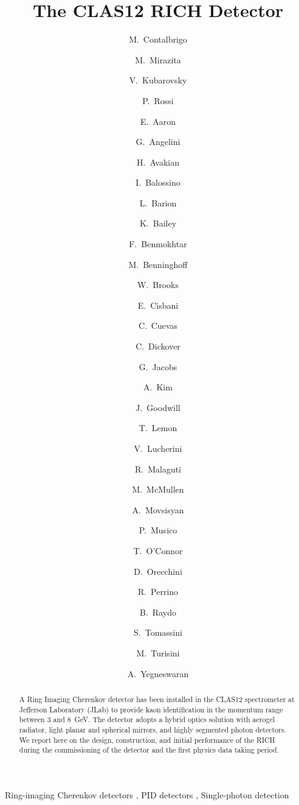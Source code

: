 \documentclass[5p,times,twocolumn]{elsarticle}
\title{The CLAS12 RICH Detector}
\begin{document}
\begin{frontmatter}

\author[a]{M.~Contalbrigo}
\author[b]{M.~Mirazita}
\author[f]{V.~Kubarovsky}
\author[f,b]{P.~Rossi}
\author[h]{E.~Aaron}
\author[b,j]{G.~Angelini}
\author[f]{H.~Avakian}
\author[a]{I.~Balossino}
\author[a]{L.~Barion}
\author[g]{K.~Bailey}
\author[h]{F.~Benmokhtar}
\author[h]{M.~Benninghoff}
\author[k]{W.~Brooks}
\author[c]{E.~Cisbani}
\author[f]{C.~Cuevas}
\author[f]{C.~Dickover}
\author[f]{G.~Jacobs}
\author[i]{A.~Kim}
\author[h]{J.~Goodwill}
\author[f]{T.~Lemon}
\author[b]{V.~Lucherini}
\author[a]{R.~Malaguti}
\author[f]{M.~McMullen}
\author[a]{A.~Movsisyan}
\author[d]{P.~Musico}
\author[g]{T.~O'Connor}
\author[b]{D.~Orecchini}
\author[e]{R.~Perrino}
\author[f]{B.~Raydo}
\author[b]{S.~Tomassini}
\author[a,b]{M.~Turisini}
\author[f]{A.~Yegneswaran}


\address[a]{INFN Sezione di Ferrara and University of Ferrara, Italy}
\address[b]{INFN Laboratori Nazionali di Frascati, Italy}
\address[c]{INFN Sezione di Roma1 - Gruppo Collegato Sanit\`a and Italian National Institute of Health, RM, Italy}
\address[d]{INFN Sezione di Genova, GE, Italy}
\address[e]{INFN Sezione di Bari, Italy}
\address[f]{Thomas Jefferson National Accelerator Facility, VA, USA}
\address[g]{Argonne National Laboratory, IL, USA}
\address[h]{Duquesne University, PA, USA}
\address[i]{University of Connecticut, CT, USA}
\address[j]{George Washington University, DC, USA}
\address[k]{Universidad Tecnica Federico Santa Maria, Valparaiso, Chile}

\begin{abstract}
  A Ring Imaging Cherenkov detector has been installed in the CLAS12 spectrometer at Jefferson Laboratory (JLab)
  to provide kaon identification in the momentum range between 3 and 8~GeV. The detector adopts a hybrid optics
  solution with aerogel radiator, light planar and spherical mirrors, and highly segmented photon detectors. We report
  here on the design, construction, and initial performance of the RICH during the commissioning of the detector and
  the first physics data taking period. 
\end{abstract}

\begin{keyword}
Ring-imaging Cherenkov detectors
\sep
PID detectors
\sep
Single-photon detection
\end{keyword}


\end{frontmatter}
\end{document}

